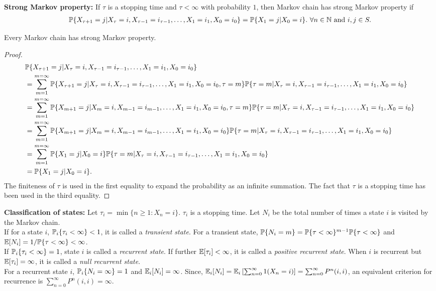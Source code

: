 \documentclass[all-lectures.tex]{subfiles}
\begin{document}
\indent \textbf{Strong Markov property:} If $\tau$ is a stopping time and $\tau < \infty$ with probability $1$, then Markov chain has strong Markov property if
\begin{align*}
\P\{X_{\tau+1} = j|X_{\tau} = i, X_{\tau-1} = i_{\tau-1},\dots,X_1 = i_1,X_0 = i_0\} = \P\{X_1 = j|X_{0} = i\}. \ \forall n \in \mathbb{N} \text{ and }i,j \in S.
\end{align*}
\begin{thm}
Every Markov chain has strong Markov property.
\begin{proof}
\begin{align*}
&\P\{X_{{\tau+1}} = j|X_{\tau} = i, X_{\tau-1} = i_{\tau-1},\dots,X_1 = i_1,X_0 = i_0\}  \\
&= \sum_{m = 1}^{m=\infty} \P\{X_{{\tau+1}} = j|X_{{\tau}} = i, X_{{\tau-1}} = i_{{\tau-1}},\dots,X_1 = i_1,X_0 = i_0,{\tau} = m\} \P\{{\tau} = m|X_{{\tau}} = i, X_{{\tau-1}} = i_{{\tau-1}},\dots,X_1 = i_1,X_0 = i_0\} \\
&= \sum_{m = 1}^{m=\infty} \P\{X_{m+1} = j|X_{m} = i, X_{m-1} = i_{m-1},\dots,X_1 = i_1,X_0 = i_0,{\tau} = m\} \P\{{\tau} = m|X_{{\tau}} = i, X_{{\tau-1}} = i_{{\tau-1}},\dots,X_1 = i_1,X_0 = i_0\} \\
&= \sum_{m = 1}^{m=\infty} \P\{X_{m+1} = j|X_{m} = i, X_{m-1} = i_{m-1},\dots,X_1 = i_1,X_0 = i_0\} \P\{{\tau} = m|X_{{\tau}} = i, X_{{\tau-1}} = i_{{\tau-1}},\dots,X_1 = i_1,X_0 = i_0\} \\
&= \sum_{m = 1}^{m=\infty} \P\{X_{1} = j|X_{0} = i\} \P\{{\tau} = m|X_{{\tau}} = i, X_{{\tau-1}} = i_{{\tau-1}},\dots,X_1 = i_1,X_0 = i_0\} \\
&= \P\{X_{1} = j|X_{0} = i\}.
\end{align*}
The finiteness of $\tau$ is used in the first equality to expand the probability as an infinite summation. The fact that ${\tau}$ is a stopping time has been used in the third equality. 
\end{proof}
\end{thm}
\textbf{Classification of states:} Let $\tau_i = \min\{n \geq 1 : X_n = i\}$. $\tau_i$ is a stopping time. Let $N_i$ be the total number of times a state $i$ is visited by the Markov chain. \\
\indent If for a state $i$, $\P_i\{\tau_i < \infty\} < 1$, it is called a \textit{{transient state}}. For a transient state, $\P\{N_i = m \} = \\ \P\{\tau < \infty\}^{m-1}\P\{\tau < \infty\}$ and $\E[N_i] = 1/\P\{\tau < \infty\}< \infty$. \\
\indent If $\P_i\{\tau_i < \infty\} = 1$, state $i$ is called a \textit{{recurrent state}}. If further $\E[\tau_i] < \infty$, it is called a \textit{positive recurrent state}. When $i$ is recurrent but $\E[\tau_i] = \infty$, it is called a \textit{null recurrent state}. \\
\indent For a recurrent state $i$, $\P_i\{N_i = \infty\} = 1$ and $\E_i[N_i] = \infty$. Since, $\E_i[N_i] = \E_i\left[\sum_{n=0}^\infty 1(X_n = i)\right] = \sum_{n=0}^\infty P^n(i,i)$, an equivalent criterion for recurrence is $\sum_{n=0}^\infty P^n(i,i) = \infty$. \\
 
\end{document}
